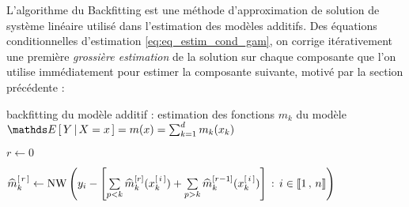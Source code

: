 {{            L'algorithme du Backfitting est une méthode d'approximation de solution de système linéaire utilisé dans l'estimation des modèles additifs. Des équations conditionnelles d'estimation \eqref{eq:eq_estim_cond_gam}, on corrige itérativement une première \emph{grossière estimation} de la solution sur chaque composante que l'on utilise immédiatement pour estimer la composante suivante, motivé par la section précédente :

            \begin{algorithm}[H]
                \normalem
                \caption{backfitting du modèle additif : estimation des fonctions $m_k$ du modèle $\esperancesachant {X=x} Y = m(x) = \sum_{k=1}^d m_k(x_k)$}\label{alg:backfitting} 
                \BlankLine
                $r \gets 0$\;
                {
                    {
                        
                        $\widehat m_k^{[\,r\,]} \gets \operatorname{NW}\left( y_i - \left[ \sum\limits_{p < k} \widehat m_k^{[r]}(x_k^{[\,i\,]}) + \sum\limits_{p > k} \widehat m_k^{[r-1]}(x_k^{[\,i\,]}) \right] \, : \, i \in \llbracket 1 \, , \, n \rrbracket\right)$ \;
                        
}}
\end{algorithm}}}
